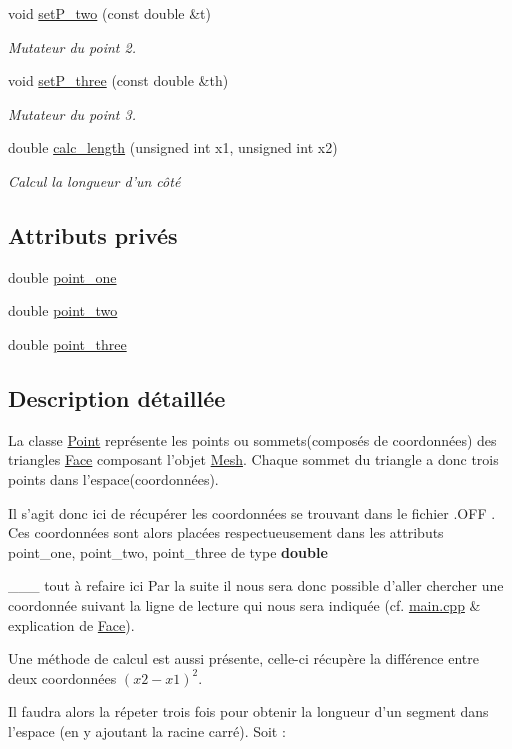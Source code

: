 \begin{DoxyCompactItemize}
void \hyperlink{class_point_a3b70e89e253f5339392990ae29313ae8}{set\-P\-\_\-two} (const double \&t)
\begin{DoxyCompactList}\small\item\em Mutateur du point 2. \end{DoxyCompactList}\item 
void \hyperlink{class_point_a097d97049b319bb131b51f990a52aa94}{set\-P\-\_\-three} (const double \&th)
\begin{DoxyCompactList}\small\item\em Mutateur du point 3. \end{DoxyCompactList}\item 
double \hyperlink{class_point_af33a5d06f58de83f60b926b04ffa5d79}{calc\-\_\-length} (unsigned int x1, unsigned int x2)
\begin{DoxyCompactList}\small\item\em Calcul la longueur d'un côté \end{DoxyCompactList}\end{DoxyCompactItemize}
\subsection*{Attributs privés}
\begin{DoxyCompactItemize}
\item 
double \hyperlink{class_point_a030522c3949dc71bc4c1f39eb1b0c77e}{point\-\_\-one}
\item 
double \hyperlink{class_point_a7eece7f7413a741137cf32bb763f3987}{point\-\_\-two}
\item 
double \hyperlink{class_point_af7cb3c4c0c0f52218ac9ce180df003da}{point\-\_\-three}
\end{DoxyCompactItemize}


\subsection{Description détaillée}
La classe \hyperlink{class_point}{Point} représente les points ou sommets(composés de coordonnées) des triangles \hyperlink{class_face}{Face} composant l'objet \hyperlink{class_mesh}{Mesh}. Chaque sommet du triangle a donc trois points dans l'espace(coordonnées). \par
Il s'agit donc ici de récupérer les coordonnées se trouvant dans le fichier .O\-F\-F . Ces coordonnées sont alors placées respectueusement dans les attributs point\-\_\-one, point\-\_\-two, point\-\_\-three de type {\bfseries double} \par
 \-\_\-\-\_\-\-\_\- tout à refaire ici Par la suite il nous sera donc possible d'aller chercher une coordonnée suivant la ligne de lecture qui nous sera indiquée (cf. \hyperlink{main_8cpp}{main.\-cpp} \& explication de \hyperlink{class_face}{Face}). \par
Une méthode de calcul est aussi présente, celle-\/ci récupère la différence entre deux coordonnées $(x2-x1)^2$. \par
Il faudra alors la répeter trois fois pour obtenir la longueur d'un segment dans l'espace (en y ajoutant la racine carré). Soit \-: \par
